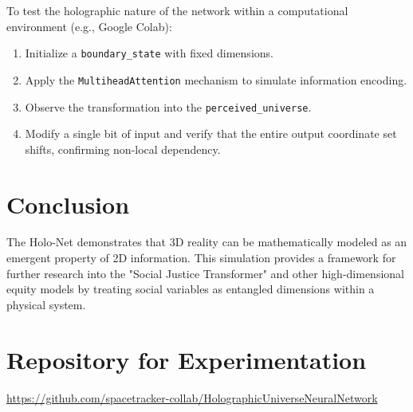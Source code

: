 \documentclass[12pt]{article}
\begin{document}
To test the holographic nature of the network within a computational environment (e.g., Google Colab):
\begin{enumerate}
    \item Initialize a \texttt{boundary\_state} with fixed dimensions.
    \item Apply the \texttt{MultiheadAttention} mechanism to simulate information encoding.
    \item Observe the transformation into the \texttt{perceived\_universe}.
    \item Modify a single bit of input and verify that the entire output coordinate set shifts, confirming non-local dependency.
\end{enumerate}

\section{Conclusion}
The Holo-Net demonstrates that 3D reality can be mathematically modeled as an emergent property of 2D information. This simulation provides a framework for further research into the "Social Justice Transformer" and other high-dimensional equity models by treating social variables as entangled dimensions within a physical system.

\section{Repository for Experimentation}
\noindent
\url{https://github.com/spacetracker-collab/HolographicUniverseNeuralNetwork}
\end{document}
